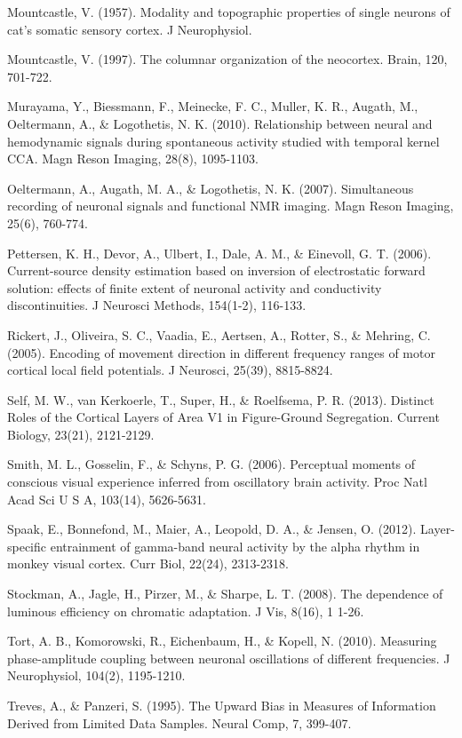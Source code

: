 \documentclass{article}
\begin{document}
Mountcastle, V. (1957). Modality and topographic properties of single neurons of cat's somatic sensory cortex. J Neurophysiol.

Mountcastle, V. (1997). The columnar organization of the neocortex. Brain, 120, 701-722.

Murayama, Y., Biessmann, F., Meinecke, F. C., Muller, K. R., Augath, M., Oeltermann, A., \& Logothetis, N. K. (2010). Relationship between neural and hemodynamic signals during spontaneous activity studied with temporal kernel CCA. Magn Reson Imaging, 28(8), 1095-1103.

Oeltermann, A., Augath, M. A., \& Logothetis, N. K. (2007). Simultaneous recording of neuronal signals and functional NMR imaging. Magn Reson Imaging, 25(6), 760-774.

Pettersen, K. H., Devor, A., Ulbert, I., Dale, A. M., \& Einevoll, G. T. (2006). Current-source density estimation based on inversion of electrostatic forward solution: effects of finite extent of neuronal activity and conductivity discontinuities. J Neurosci Methods, 154(1-2), 116-133.

Rickert, J., Oliveira, S. C., Vaadia, E., Aertsen, A., Rotter, S., \& Mehring, C. (2005). Encoding of movement direction in different frequency ranges of motor cortical local field potentials. J Neurosci, 25(39), 8815-8824.

Self, M. W., van Kerkoerle, T., Super, H., \& Roelfsema, P. R. (2013). Distinct Roles of the Cortical Layers of Area V1 in Figure-Ground Segregation. Current Biology, 23(21), 2121-2129.

Smith, M. L., Gosselin, F., \& Schyns, P. G. (2006). Perceptual moments of conscious visual experience inferred from oscillatory brain activity. Proc Natl Acad Sci U S A, 103(14), 5626-5631.

Spaak, E., Bonnefond, M., Maier, A., Leopold, D. A., \& Jensen, O. (2012). Layer-specific entrainment of gamma-band neural activity by the alpha rhythm in monkey visual cortex. Curr Biol, 22(24), 2313-2318.

Stockman, A., Jagle, H., Pirzer, M., \& Sharpe, L. T. (2008). The dependence of luminous efficiency on chromatic adaptation. J Vis, 8(16), 1 1-26.

Tort, A. B., Komorowski, R., Eichenbaum, H., \& Kopell, N. (2010). Measuring phase-amplitude coupling between neuronal oscillations of different frequencies. J Neurophysiol, 104(2), 1195-1210.

Treves, A., \& Panzeri, S. (1995). The Upward Bias in Measures of Information Derived from Limited Data Samples. Neural Comp, 7, 399-407.
\end{document}
